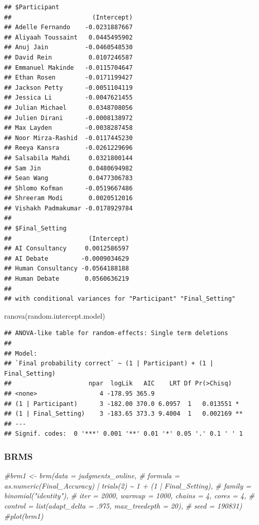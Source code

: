 \documentclass[
]{article}
\newenvironment{Shaded}{\begin{snugshade}}{\end{snugshade}}
\newcommand{\CommentTok}[1]{\textcolor[rgb]{0.56,0.35,0.01}{\textit{#1}}}
\newcommand{\FunctionTok}[1]{\textcolor[rgb]{0.00,0.00,0.00}{#1}}
\newcommand{\NormalTok}[1]{#1}
\begin{document}
\begin{verbatim}
## $Participant
##                      (Intercept)
## Adelle Fernando    -0.0231887667
## Aliyaah Toussaint   0.0445495902
## Anuj Jain          -0.0460548530
## David Rein          0.0107246587
## Emmanuel Makinde   -0.0115704647
## Ethan Rosen        -0.0171199427
## Jackson Petty      -0.0051104119
## Jessica Li         -0.0047621455
## Julian Michael      0.0348708056
## Julien Dirani      -0.0008138972
## Max Layden         -0.0038287458
## Noor Mirza-Rashid  -0.0117445230
## Reeya Kansra       -0.0261229696
## Salsabila Mahdi     0.0321800144
## Sam Jin             0.0480694982
## Sean Wang           0.0477306783
## Shlomo Kofman      -0.0519667486
## Shreeram Modi       0.0020512016
## Vishakh Padmakumar -0.0178929784
## 
## $Final_Setting
##                     (Intercept)
## AI Consultancy     0.0012586597
## AI Debate         -0.0009034629
## Human Consultancy -0.0564188188
## Human Debate       0.0560636219
## 
## with conditional variances for "Participant" "Final_Setting"
\end{verbatim}

\begin{Shaded}
\begin{Highlighting}[]
\FunctionTok{ranova}\NormalTok{(random.intercept.model)}
\end{Highlighting}
\end{Shaded}

\begin{verbatim}
## ANOVA-like table for random-effects: Single term deletions
## 
## Model:
## `Final probability correct` ~ (1 | Participant) + (1 | Final_Setting)
##                     npar  logLik   AIC    LRT Df Pr(>Chisq)   
## <none>                 4 -178.95 365.9                        
## (1 | Participant)      3 -182.00 370.0 6.0957  1   0.013551 * 
## (1 | Final_Setting)    3 -183.65 373.3 9.4004  1   0.002169 **
## ---
## Signif. codes:  0 '***' 0.001 '**' 0.01 '*' 0.05 '.' 0.1 ' ' 1
\end{verbatim}

\hypertarget{brms}{%
\subsubsection{BRMS}\label{brms}}

\begin{Shaded}
\begin{Highlighting}[]
\CommentTok{\#brm1 \textless{}{-} brm(data = judgments\_online,}
\CommentTok{\#             formula = as.numeric(Final\_Accuracy) | trials(2) \textasciitilde{} 1 + (1 | Final\_Setting),}
\CommentTok{\#             family = binomial("identity"),}
\CommentTok{\#             iter = 2000, warmup = 1000, chains = 4, cores = 4,}
\CommentTok{\#             control = list(adapt\_delta = .975, max\_treedepth = 20),}
\CommentTok{\#             seed = 190831)}
\CommentTok{\#plot(brm1)}
\end{Highlighting}
\end{Shaded}
\end{document}
